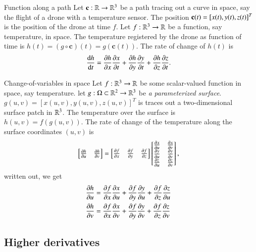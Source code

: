 \begin{myExample}{Function along a path}{}
Let $\mathbf{c} : \mathbb{R} \to \mathbb{R}^3$ be a path tracing out a curve in space, say the flight of a drone with a temperature sensor. The position $\mathbf{c}(t) = [x(t),y(t),z(t)]^T$ is the position of the drone at time $f$. Let $f : \mathbb{R}^3 \to \mathbb{R}$ be a function, say temperature, in space. The temperature registered by the drone as function of time is $h(t) = (g \circ \mathbf{c})(t) = g(\mathbf{c}(t))$. The rate of change of $h(t)$ is
\begin{equation}
    \frac{\mathrm{d} h}{\mathrm{d} t} = \frac{\partial h}{\partial x}\frac{\partial x}{\partial t} + \frac{\partial h}{\partial y}\frac{\partial y}{\partial t} + \frac{\partial h}{\partial z}\frac{\partial z}{\partial t}.
\end{equation}
\end{myExample}

\begin{myExample}{Change-of-variables in space}{}
Let $f : \mathbb{R}^3 \to \mathbb{R}$ be some scalar-valued function in space, say temperature. let $g : \Omega \subset \mathbb{R}^2 \to \mathbb{R}^3$ be \emph{a parameterized surface}. $g(u,v)= [x(u,v), y(u,v), z(u,v)]^T$ is traces out a two-dimensional surface patch in $\mathbb{R}^3$. The temperature over the surface is $h(u,v) = f(g(u,v))$. The rate of change of the temperature along the surface coordinates $(u,v)$ is
\begin{equation}
    \begin{bmatrix} \frac{\partial h}{\partial u} & \frac{\partial h}{\partial v} \end{bmatrix} = \begin{bmatrix} \frac{\partial f}{\partial x} & \frac{\partial f}{\partial y} & \frac{\partial f}{\partial z} \end{bmatrix} \begin{bmatrix} \frac{\partial x}{\partial u} & \frac{\partial x}{\partial v} \\ \frac{\partial y}{\partial u} & \frac{\partial y}{\partial v} \\ \frac{\partial z}{\partial u} & \frac{\partial z}{\partial v} \end{bmatrix},
\end{equation}
written out, we get
\begin{align}
    \frac{\partial h}{\partial u} &= \frac{\partial f}{\partial x}\frac{\partial x}{\partial u} + \frac{\partial f}{\partial y}\frac{\partial y}{\partial u} + \frac{\partial f}{\partial z}\frac{\partial z}{\partial u} \\
    \frac{\partial h}{\partial v} &= \frac{\partial f}{\partial x}\frac{\partial x}{\partial v} + \frac{\partial f}{\partial y}\frac{\partial y}{\partial v} + \frac{\partial f}{\partial z}\frac{\partial z}{\partial v} \\
\end{align}
\end{myExample}


\subsection{Higher derivatives}

